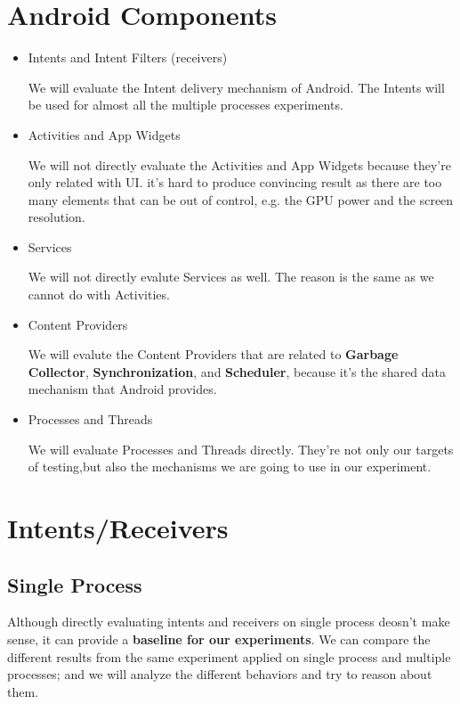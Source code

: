 \documentclass[11pt]{article}
\begin{document}
\section{Android Components}
\label{sec-2}
\begin{itemize}
\item Intents and Intent Filters (receivers)

We will evaluate the Intent delivery mechanism of Android.
The Intents will be used for almost all the multiple processes experiments.

\item Activities and App Widgets

We will not directly evaluate the Activities and App Widgets because they're only related with UI.
it's hard to produce convincing result as there are too many elements that can be out of control,
e.g. the GPU power and the screen resolution.

\item Services

We will not directly evalute Services as well. The reason is the same as we cannot do with Activities.

\item Content Providers

We will evalute the Content Providers that are related to \textbf{Garbage Collector}, \textbf{Synchronization},
and \textbf{Scheduler}, because it's the shared data mechanism that Android provides.
\end{itemize}


\begin{itemize}
\item Processes and Threads

We will evaluate Processes and Threads directly.
They're not only our targets of testing,but also the mechanisms we are going to use in our experiment.
\end{itemize}

\section{Intents/Receivers}
\label{sec-3}
\subsection{Single Process}
\label{sec-3-1}
Although directly evaluating intents and receivers on
single process deosn't make sense,
it can provide a \textbf{baseline for our experiments}.
We can compare the different results from the same experiment applied on single process
and multiple processes;
and we will analyze the different behaviors and try to reason about them.
\end{document}
